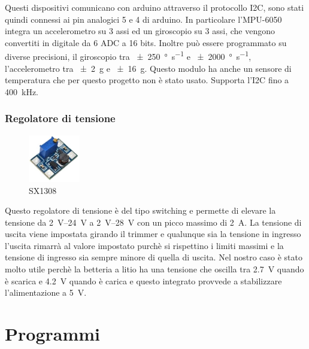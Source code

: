 \documentclass[10pt,a4paper]{article}
\begin{document}
Questi dispositivi comunicano con arduino attraverso il protocollo I2C, sono stati quindi connessi ai pin analogici 5 e 4 di arduino.
In particolare l'MPU-6050 integra un accelerometro su 3 assi ed un giroscopio su 3 assi, che vengono convertiti in digitale da 6 ADC a 16 bits. Inoltre pu\`o essere programmato su diverse precisioni, il giroscopio tra \SI[per-mode = symbol]{+-250}{\degree\per\second} e \SI[per-mode = symbol]{+-2000}{\degree\per\second}, l'accelerometro tra \SI[per-mode = symbol]{+-2}{g} e \SI[per-mode = symbol]{+-16}{g}. Questo modulo ha anche un sensore di temperatura che per questo progetto non \`e  stato usato. Supporta l'I2C fino a \SI{400}{\kilo \hertz}.

\subsubsection{Regolatore di tensione}
\begin{figure}
	\centering
	\vspace{-30pt}
	\includegraphics[width=0.2\textwidth]{DC-DC_sx1308.jpg}
	\vspace{-20pt}
	\caption{SX1308}
	\label{fig:sx1308}
\end{figure}
Questo regolatore di tensione \`e del tipo switching e permette di elevare la tensione da \SIrange{2}{24}{\volt} a \SIrange{2}{28}{\volt} con un picco massimo di \SI{2}{\ampere}. La tensione di uscita viene impostata girando il trimmer e qualunque sia la tensione in ingresso l'uscita rimarr\`a al valore impostato purch\`e si rispettino i limiti massimi e la tensione di ingresso sia sempre minore di quella di uscita. Nel nostro caso \`e stato molto utile perch\`e la betteria a litio ha una tensione che oscilla tra \SI{2.7}{\volt} quando \`e scarica e \SI{4.2}{\volt} quando \`e carica e questo integrato provvede a stabilizzare l'alimentazione a \SI{5}{\volt}.


\section{Programmi}
\end{document}
